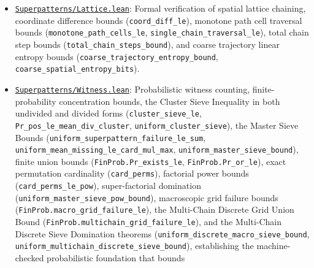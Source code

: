 \documentclass[
  11pt,
]{article}
\begin{document}
\begin{itemize}
  \texttt{bundle\_tracks\_disjoint}), the backward cross-layer monotonicity
  invariants (\texttt{backward\_chain\_monotonicity},
  \texttt{backward\_chain\_strict\_monotonicity}), the forward descent
  chain strict increasing theorem (\texttt{forward\_descent\_chain\_strict\_increasing})
  proving that canonical Dilworth chains require zero backward cross-layer
  inversions, and the Coordinate Track Buffer theorems (\texttt{intra\_row\_track\_separation},
  \texttt{cross\_row\_track\_separation}, \texttt{track\_buffer\_order\_fidelity}) proving that
  dedicated sub-tracks guarantee zero coordinate collisions and exact order fidelity across same-row
  and cross-row cells.
\item
  \href{https://github.com/adamhadani/superpatterns/blob/main/formal-verification/lean/Superpatterns/Lattice.lean}{\texttt{Superpatterns/Lattice.lean}}:
  Formal verification of spatial lattice chaining, coordinate difference
  bounds (\texttt{coord\_diff\_le}), monotone path cell traversal bounds
  (\texttt{monotone\_path\_cells\_le},
  \texttt{single\_chain\_traversal\_le}), total chain step bounds
  (\texttt{total\_chain\_steps\_bound}), and coarse trajectory linear
  entropy bounds (\texttt{coarse\_trajectory\_entropy\_bound},
  \texttt{coarse\_spatial\_entropy\_bits}).
\item
  \href{https://github.com/adamhadani/superpatterns/blob/main/formal-verification/lean/Superpatterns/Witness.lean}{\texttt{Superpatterns/Witness.lean}}:
  Probabilistic witness counting, finite-probability concentration
  bounds, the Cluster Sieve Inequality in both undivided and divided
  forms (\texttt{cluster\_sieve\_le},
  \texttt{Pr\_pos\_le\_mean\_div\_cluster},
  \texttt{uniform\_cluster\_sieve}), the Master Sieve Bounds
  (\texttt{uniform\_superpattern\_failure\_le\_sum},
  \texttt{uniform\_mean\_missing\_le\_card\_mul\_max},
  \texttt{uniform\_master\_sieve\_bound}), finite union bounds
  (\texttt{FinProb.Pr\_exists\_le}, \texttt{FinProb.Pr\_or\_le}), exact
  permutation cardinality (\texttt{card\_perms}), factorial power bounds
  (\texttt{card\_perms\_le\_pow}), super-factorial domination
  (\texttt{uniform\_master\_sieve\_pow\_bound}), macroscopic grid failure
  bounds (\texttt{FinProb.macro\_grid\_failure\_le}), the Multi-Chain
  Discrete Grid Union Bound (\texttt{FinProb.multichain\_grid\_failure\_le}),
  and the Multi-Chain Discrete Sieve Domination theorems
  (\texttt{uniform\_discrete\_macro\_sieve\_bound},
  \texttt{uniform\_multichain\_discrete\_sieve\_bound}),
  establishing the machine-checked probabilistic foundation that bounds

\end{itemize}
\end{document}

